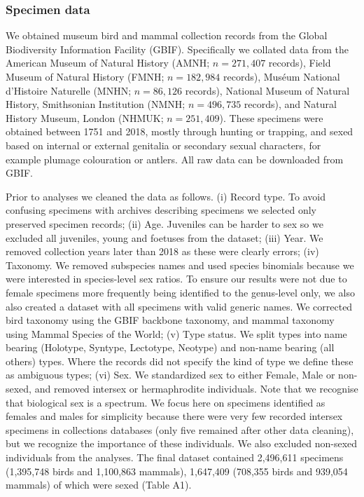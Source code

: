 \documentclass[a4paper, 12pt]{article}
\begin{document}
\subsubsection{Specimen data} 
We obtained museum bird and mammal collection records from the Global Biodiversity Information Facility (GBIF\cite{gbif}). 
Specifically we collated data from the American Museum of Natural History (AMNH; $n = 271,407$ records\cite{amnh-birds,amnh-mammals}), Field Museum of Natural History (FMNH; $n = 182,984$ records\cite{fmnh-birds,fmnh-mammals}), Mus\'{e}um National d'Histoire Naturelle (MNHN; $n = 86,126$ records\cite{mnhn-birds,mnhn-mammals}), National Museum of Natural History, Smithsonian Institution (NMNH; $n = 496,735$ records\cite{smithsonian-both}), and Natural History Museum, London (NHMUK; $n = 251,409$\cite{nhm-all}).
These specimens were obtained between 1751 and 2018, mostly through hunting or trapping, and sexed based on internal or external genitalia or secondary sexual characters, for example plumage colouration or antlers.
All raw data can be downloaded from GBIF\cite{gbif}.
 
Prior to analyses we cleaned the data as follows. 
(i) Record type. To avoid confusing specimens with archives describing specimens we selected only preserved specimen records; 
(ii) Age. Juveniles can be harder to sex so we excluded all juveniles, young and foetuses from the dataset; 
(iii) Year. We removed collection years later than 2018 as these were clearly errors; 
(iv) Taxonomy. We removed subspecies names and used species binomials because we were interested in species-level sex ratios. 
To ensure our results were not due to female specimens more frequently being identified to the genus-level only, we also also created a dataset with all specimens with valid generic names.
We corrected bird taxonomy using the GBIF backbone taxonomy\cite{gbif}, and mammal taxonomy using Mammal Species of the World\cite{wilson2005mammal}; 
(v) Type status. We split types into name bearing (Holotype, Syntype, Lectotype, Neotype) and non-name bearing (all others) types. Where the records did not specify the kind of type we define these as ambiguous types; 
(vi) Sex. We standardized sex to either Female, Male or non-sexed, and removed intersex or hermaphrodite individuals. 
Note that we recognise that biological sex is a spectrum\cite{sciam2017}. 
We focus here on specimens identified as females and males for simplicity because there were very few recorded intersex specimens in collections databases (only five remained after other data cleaning), but we recognize the importance of these individuals.
We also excluded non-sexed individuals from the analyses.
The final dataset contained 2,496,611 specimens (1,395,748 birds and 1,100,863 mammals), 1,647,409 (708,355 birds and 939,054 mammals) of which were sexed (Table A1).
\end{document}
